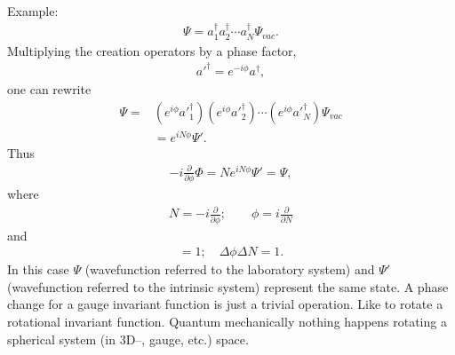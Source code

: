 Example:
\begin{align*}
\Psi=a_1^\dagger a_2^\dagger\dotsb a_N^\dagger \Psi_{vac}.
\end{align*}
Multiplying the creation operators by a phase factor,
\begin{align*}
a'^\dagger= e^{-i\phi} a^\dagger,
\end{align*}
one can rewrite
\begin{align*}
\Psi=&(e^{i\phi} a'^\dagger_1)(e^{i\phi} a'^\dagger_2)\dotsb(e^{i\phi} a'^\dagger_N)\Psi_{vac}\\
&=e^{iN\phi}\Psi'.
\end{align*}
Thus
\begin{align*}
-i\frac{\partial}{\partial \phi}\Phi=Ne^{iN\phi}\Psi'=\Psi,
\end{align*}
where
\begin{align*}
N=-i\frac{\partial}{\partial \phi};\quad\quad \phi=i\frac{\partial}{\partial N}
\end{align*}
and
\begin{align*}
[\phi,N]=1;\quad\Delta \phi \Delta N=1.
\end{align*}
In this case $\Psi$ (wavefunction referred to the laboratory system) and $\Psi'$ (wavefunction referred to the intrinsic system) represent the same state. A phase change for a gauge invariant function is just a trivial operation. Like to rotate a rotational invariant function. Quantum mechanically nothing happens rotating a spherical system (in 3D--, gauge, etc.) space.


